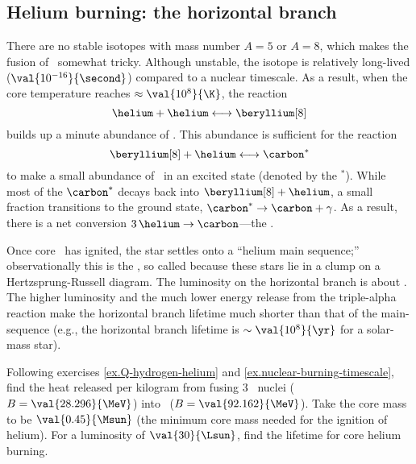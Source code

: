\subsection{Helium burning: the horizontal branch}
There are no stable isotopes with mass number $A=5$ or $A=8$, which makes the fusion of \helium\ somewhat tricky. Although unstable, the isotope \beryllium[8] is relatively long-lived ($\val{10^{-16}}{\second}$) compared to a nuclear timescale. As a result,
when the core temperature reaches $\approx\val{10^{8}}{\K}$, the reaction
\[ \helium + \helium \longleftrightarrow\beryllium[8] \]
builds up a minute abundance of \beryllium[8]. This abundance is sufficient for the reaction
\[ \beryllium[8] + \helium \longleftrightarrow \carbon^{*} \]
to make a small abundance of \carbon\ in an excited state (denoted by the $^{*}$).  While most of the $\carbon^{*}$ decays back into $\beryllium[8]+\helium$, a small fraction transitions to the ground state, $\carbon^{*}\to\carbon+\gamma$. As a result, there is a net conversion $3\,\helium\to\carbon$---the .

Once core \helium\ has ignited, the star settles onto a ``helium main sequence;'' observationally this is the , so called because these stars lie in a clump on a Hertzsprung-Russell diagram. The luminosity on the horizontal branch is about . The higher luminosity and the much lower energy release from the triple-alpha reaction make the horizontal branch lifetime much shorter than that of the main-sequence (e.g., the horizontal branch lifetime is $\sim \val{10^{8}}{\yr}$ for a solar-mass star).

\begin{exercisebox}
Following exercises \ref{ex.Q-hydrogen-helium} and \ref{ex.nuclear-burning-timescale}, find the heat released per kilogram from fusing 3 \helium\ nuclei ($B=\val{28.296}{\MeV}$) into \carbon\ ($B=\val{92.162}{\MeV}$). Take the core mass to be $\val{0.45}{\Msun}$ (the minimum core mass needed for the ignition of helium). For a luminosity of $\val{30}{\Lsun}$, find the lifetime for core helium burning.
\end{exercisebox}

